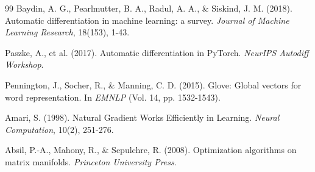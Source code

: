 ﻿\documentclass[a4paper,12pt]{article}
\theoremstyle{definition}
\begin{document}
\begin{thebibliography}{99}
Baydin, A. G., Pearlmutter, B. A., Radul, A. A., \& Siskind, J. M. (2018). Automatic differentiation in machine learning: a survey. \textit{Journal of Machine Learning Research}, 18(153), 1-43.

Paszke, A., et al. (2017). Automatic differentiation in PyTorch. \textit{NeurIPS Autodiff Workshop}.

Pennington, J., Socher, R., \& Manning, C. D. (2015). Glove: Global vectors for word representation. In \textit{EMNLP} (Vol. 14, pp. 1532-1543).

Amari, S. (1998). Natural Gradient Works Efficiently in Learning. \textit{Neural Computation}, 10(2), 251-276.

Absil, P.-A., Mahony, R., \& Sepulchre, R. (2008). Optimization algorithms on matrix manifolds. \textit{Princeton University Press}.

\end{thebibliography}
\end{document}
